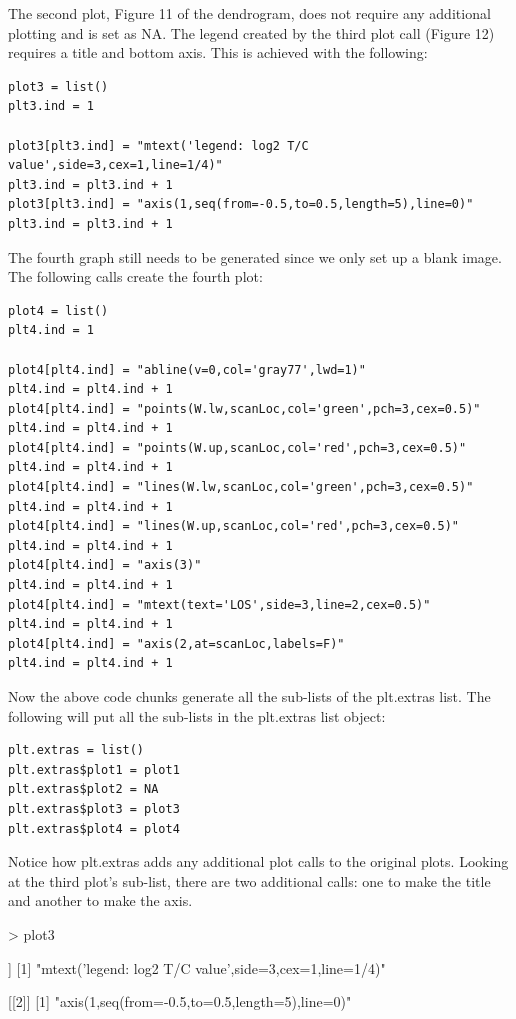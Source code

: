 \documentclass[]{article}
\begin{document}
\indent The second plot, Figure 11 of the  dendrogram, does not require any additional plotting and is set as NA. The legend created by the third plot call (Figure 12) requires a title and bottom axis. This is achieved with the following:

\begin{verbatim}
plot3 = list()
plt3.ind = 1

plot3[plt3.ind] = "mtext('legend: log2 T/C value',side=3,cex=1,line=1/4)"
plt3.ind = plt3.ind + 1
plot3[plt3.ind] = "axis(1,seq(from=-0.5,to=0.5,length=5),line=0)"
plt3.ind = plt3.ind + 1
\end{verbatim}



\indent The fourth graph still needs to be generated since we only set up a blank image. The following calls create the fourth plot:

\begin{verbatim}
plot4 = list()
plt4.ind = 1

plot4[plt4.ind] = "abline(v=0,col='gray77',lwd=1)"
plt4.ind = plt4.ind + 1
plot4[plt4.ind] = "points(W.lw,scanLoc,col='green',pch=3,cex=0.5)"
plt4.ind = plt4.ind + 1
plot4[plt4.ind] = "points(W.up,scanLoc,col='red',pch=3,cex=0.5)"
plt4.ind = plt4.ind + 1
plot4[plt4.ind] = "lines(W.lw,scanLoc,col='green',pch=3,cex=0.5)"
plt4.ind = plt4.ind + 1
plot4[plt4.ind] = "lines(W.up,scanLoc,col='red',pch=3,cex=0.5)"
plt4.ind = plt4.ind + 1
plot4[plt4.ind] = "axis(3)"
plt4.ind = plt4.ind + 1
plot4[plt4.ind] = "mtext(text='LOS',side=3,line=2,cex=0.5)"
plt4.ind = plt4.ind + 1
plot4[plt4.ind] = "axis(2,at=scanLoc,labels=F)"
plt4.ind = plt4.ind + 1
\end{verbatim}


\indent Now the above code chunks generate all the sub-lists of the plt.extras list. The following will put all the sub-lists in the plt.extras list object:

\begin{verbatim}
plt.extras = list()
plt.extras$plot1 = plot1
plt.extras$plot2 = NA
plt.extras$plot3 = plot3
plt.extras$plot4 = plot4
\end{verbatim}



\indent  Notice how plt.extras adds any additional plot calls to the original plots. Looking at the third plot's sub-list, there are two additional calls: one to make the title and another to make the axis. 

\begin{Schunk}
\begin{Sinput}
> plot3
\end{Sinput}
\begin{Soutput}
[[1]]
[1] "mtext('legend: log2 T/C value',side=3,cex=1,line=1/4)"

[[2]]
[1] "axis(1,seq(from=-0.5,to=0.5,length=5),line=0)"
\end{Soutput}
\end{Schunk}
\end{document}
